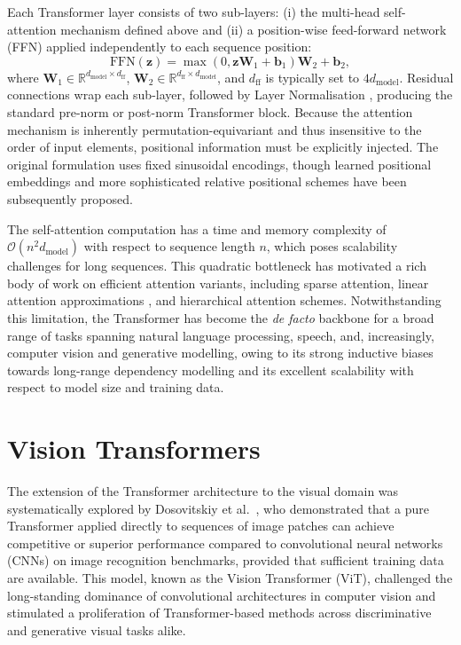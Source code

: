 Each Transformer layer consists of two sub-layers: (i) the multi-head self-attention mechanism defined above and (ii) a position-wise feed-forward network (FFN) applied independently to each sequence position:
\begin{equation}
    \text{FFN}(\mathbf{z}) = \max(0, \mathbf{z}\mathbf{W}_1 + \mathbf{b}_1)\mathbf{W}_2 + \mathbf{b}_2,
    \label{eq:ffn}
\end{equation}
where $\mathbf{W}_1 \in \mathbb{R}^{d_{\text{model}} \times d_{\text{ff}}}$, $\mathbf{W}_2 \in \mathbb{R}^{d_{\text{ff}} \times d_{\text{model}}}$, and $d_{\text{ff}}$ is typically set to $4 d_{\text{model}}$. Residual connections \cite{he2016deep} wrap each sub-layer, followed by Layer Normalisation \cite{ba2016layer}, producing the standard pre-norm or post-norm Transformer block. Because the attention mechanism is inherently permutation-equivariant and thus insensitive to the order of input elements, positional information must be explicitly injected. The original formulation uses fixed sinusoidal encodings, though learned positional embeddings and more sophisticated relative positional schemes have been subsequently proposed.

The self-attention computation has a time and memory complexity of $\mathcal{O}(n^2 d_{\text{model}})$ with respect to sequence length $n$, which poses scalability challenges for long sequences. This quadratic bottleneck has motivated a rich body of work on efficient attention variants, including sparse attention, linear attention approximations \cite{katharopoulos2020transformers}, and hierarchical attention schemes. Notwithstanding this limitation, the Transformer has become the \emph{de facto} backbone for a broad range of tasks spanning natural language processing, speech, and, increasingly, computer vision and generative modelling, owing to its strong inductive biases towards long-range dependency modelling and its excellent scalability with respect to model size and training data.


\section{Vision Transformers}
\label{sec:vit}

The extension of the Transformer architecture to the visual domain was systematically explored by Dosovitskiy et al.\ \cite{dosovitskiy2020image}, who demonstrated that a pure Transformer applied directly to sequences of image patches can achieve competitive or superior performance compared to convolutional neural networks (CNNs) on image recognition benchmarks, provided that sufficient training data are available. This model, known as the Vision Transformer (ViT), challenged the long-standing dominance of convolutional architectures in computer vision and stimulated a proliferation of Transformer-based methods across discriminative and generative visual tasks alike.

